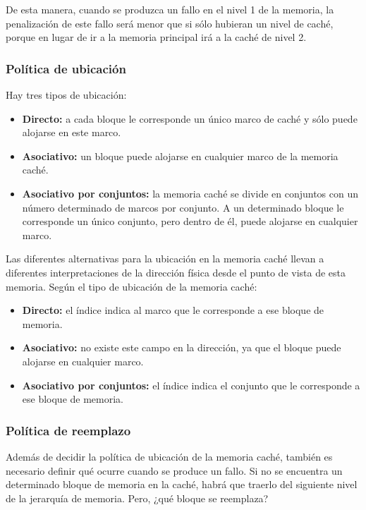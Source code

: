 De esta manera, cuando se produzca un fallo en el nivel 1 de la memoria, la penalización de este fallo será menor que si sólo hubieran un nivel de caché, porque en lugar de ir a la memoria principal irá a la caché de nivel 2.

\subsubsection*{Política de ubicación}

Hay tres tipos de ubicación:

\begin{itemize}
  \item \textbf{Directo:} a cada bloque le corresponde un único marco de caché y sólo puede alojarse en este marco.
  \item \textbf{Asociativo:} un bloque puede alojarse en cualquier marco de la memoria caché.
  \item \textbf{Asociativo por conjuntos:} la memoria caché se divide en conjuntos con un número determinado de marcos por conjunto. A un determinado bloque le corresponde un único conjunto, pero dentro de él, puede alojarse en cualquier marco.
\end{itemize}

Las diferentes alternativas para la ubicación en la memoria caché llevan a diferentes interpretaciones de la dirección física desde el punto de vista de esta memoria. Según el tipo de ubicación de la memoria caché:

\begin{itemize}
  \item \textbf{Directo:} el índice indica al marco que le corresponde a ese bloque de memoria.
  \item \textbf{Asociativo:} no existe este campo en la dirección, ya que el bloque puede alojarse en cualquier marco.
  \item \textbf{Asociativo por conjuntos:} el índice indica el conjunto que le corresponde a ese bloque de memoria.
\end{itemize}

\subsubsection*{Política de reemplazo}

Además de decidir la política de ubicación de la memoria caché, también es necesario definir qué ocurre cuando se produce un fallo. Si no se encuentra un determinado bloque de memoria en la caché, habrá que traerlo del siguiente nivel de la jerarquía de memoria. Pero, ¿qué bloque se reemplaza?

